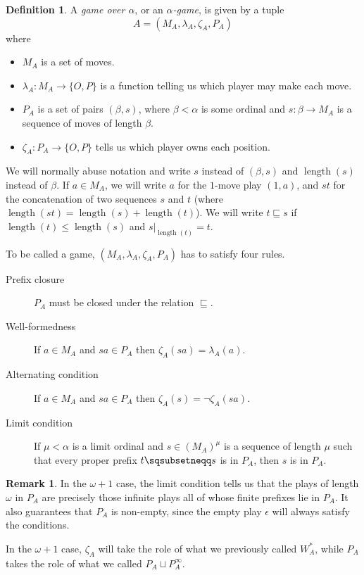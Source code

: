 \documentclass[11pt]{article} %
\theoremstyle{plain} %
\theoremstyle{definition} %
\newtheorem{definition}[theorem]{Definition}
\newtheorem{remark}[theorem]{Remark}
\theoremstyle{note}
\theoremstyle{exercisestyle}
\newcommand*\from{\colon}
\newcommand{\cmap}[3]{#1\from{}#2\to{}#3}
\newcommand{\cprd}{\sqcup}
\newcommand{\OP}{\{O,P\}}
\newcommand{\emptyplay}{\epsilon}
\newcommand{\prefix}{\sqsubseteq}
\newcommand{\pprefix}{\sqsubsetneqq}
\DeclareMathOperator{\length}{length}
\begin{document}
\begin{definition}
  A \emph{game over $\alpha$}, or an \emph{$\alpha$-game}, is given by a tuple
  \[
    A = (M_A, \lambda_A, \zeta_A, P_A)
    \]
  where
  \begin{itemize}
    \item $M_A$ is a set of moves.
    \item $\cmap{\lambda_A}{M_A}{\OP}$ is a function telling us which player may make each move.
    \item $P_A$ is a set of pairs $(\beta, s)$, where $\beta<\alpha$ is some ordinal and $\cmap{s}{\beta}{M_A}$ is a sequence of moves of length $\beta$.  
    \item $\cmap{\zeta_A}{P_A}{\OP}$ tells us which player owns each position.
  \end{itemize}

  We will normally abuse notation and write $s$ instead of $(\beta, s)$ and $\length(s)$ instead of $\beta$.  If $a\in M_A$, we will write $a$ for the $1$-move play $(1, a)$, and $st$ for the concatenation of two sequences $s$ and $t$ (where $\length(st)=\length(s)+\length(t)$).  We will write $t\prefix s$ if $\length(t)\le\length(s)$ and $s\vert_{\length(t)}=t$.  

  To be called a game, $(M_A, \lambda_A, \zeta_A, P_A)$ has to satisfy four rules.
  \begin{description}
    \item[Prefix closure] $P_A$ must be closed under the relation $\prefix$.  
    \item[Well-formedness] If $a\in M_A$ and $sa\in P_A$ then $\zeta_A(sa)=\lambda_A(a)$.  
    \item[Alternating condition] If $a\in M_A$ and $sa\in P_A$ then $\zeta_A(s)=\neg\zeta_A(sa)$.
    \item[Limit condition] If $\mu<\alpha$ is a limit ordinal and $s\in(M_A)^\mu$ is a sequence of length $\mu$ such that every proper prefix $t\pprefix s$ is in $P_A$, then $s$ is in $P_A$.  
  \end{description}
\end{definition}

\begin{remark}
  In the $\omega+1$ case, the limit condition tells us that the plays of length $\omega$ in $P_A$ are precisely those infinite plays all of whose finite prefixes lie in $P_A$.  It also guarantees that $P_A$ is non-empty, since the empty play $\emptyplay$ will always satisfy the conditions.

  In the $\omega+1$ case, $\zeta_A$ will take the role of what we previously called $W_A^*$, while $P_A$ takes the role of what we called $P_A\cprd P_A^\infty$.  
\end{remark}
\end{document}
